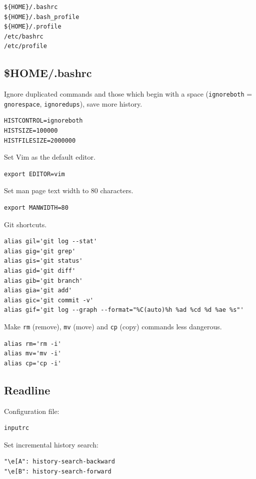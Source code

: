 \documentclass[12pt,a4paper]{article}
\begin{document}
\begin{verbatim}
${HOME}/.bashrc
${HOME}/.bash_profile
${HOME}/.profile
/etc/bashrc
/etc/profile
\end{verbatim}

\subsection{\$HOME/.bashrc}

Ignore duplicated commands and those which begin with a space (\verb"ignoreboth"
= \verb"gnorespace", \verb"ignoredups"), save more history.

\begin{verbatim}
HISTCONTROL=ignoreboth
HISTSIZE=100000
HISTFILESIZE=2000000
\end{verbatim}

Set Vim as the default editor.

\begin{verbatim}
export EDITOR=vim
\end{verbatim}

Set man page text width to 80 characters.

\begin{verbatim}
export MANWIDTH=80
\end{verbatim}

Git shortcuts.

\begin{verbatim}
alias gil='git log --stat'
alias gig='git grep'
alias gis='git status'
alias gid='git diff'
alias gib='git branch'
alias gia='git add'
alias gic='git commit -v'
alias gif='git log --graph --format="%C(auto)%h %ad %cd %d %ae %s"'
\end{verbatim}

Make \texttt{rm} (remove), \texttt{mv} (move) and \texttt{cp} (copy) commands less dangerous.

\begin{verbatim}
alias rm='rm -i'
alias mv='mv -i'
alias cp='cp -i'
\end{verbatim}

\subsection{Readline}

Configuration file:

\begin{verbatim}
inputrc
\end{verbatim}

Set incremental history search:
\begin{verbatim}
"\e[A": history-search-backward
"\e[B": history-search-forward
\end{verbatim}
\end{document}
